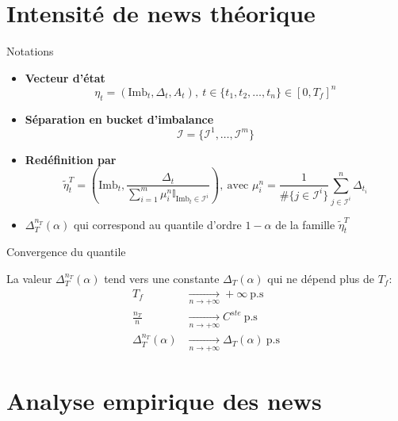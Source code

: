 \documentclass[aspectratio=169]{beamer}  %
\begin{document}
\section{Intensité de news théorique}

\begin{frame}{Notations}
     \hspace{1cm}
    \begin{itemize}
        \item \textbf{Vecteur d'état}$$\eta_t = (\text{Imb}_t, \Delta_t, {A_t}), \ t\in\{t_1,t_2,\dots,t_n\}\in [0,T_f]^n $$
        \item \textbf{Séparation en bucket d'imbalance} $$\mathcal I= \{\mathcal I^1,\dots,\mathcal I^m\}$$
        \item \textbf{Redéfinition par} $$\tilde \eta_t^T = \left(\text{Imb}_t, \frac{\Delta_t}{\sum_{i=1}^m\mu_i^n\mathbb{I}_{\text{Imb}_t\in\mathcal{I}^{i}}}\right), \ \text{avec } \mu_i^n = \frac{1}{\#\{j\in \mathcal I^i\}}\sum_{j\in \mathcal I^i}^n\Delta_{t_i}$$
        \item $\Delta_T^{n_T}(\alpha)$ qui correspond au quantile d'ordre $1-\alpha$ de la famille $\tilde \eta_t^T$
    \end{itemize}
\end{frame}

\begin{frame}{Convergence du quantile}
    \begin{theorem}
        La valeur $\Delta_T^{n_T}(\alpha)$ tend vers une constante $\Delta_T(\alpha)$ qui ne dépend plus de $T_f$:
        \begin{align*}
            T_f &\underset{n\to +\infty}{\to}+\infty \ \text{p.s} \\
            \frac{n_T}{n} &\underset{n\to +\infty}{\to}C^{ste} \ \text{p.s} \\
            \Delta_T^{n_T}(\alpha) &\underset{n\to +\infty}{\to}\Delta_T(\alpha) \ \text{p.s}
        \end{align*}
    \end{theorem}
\end{frame}



\section{Analyse empirique des news}
\end{document}
